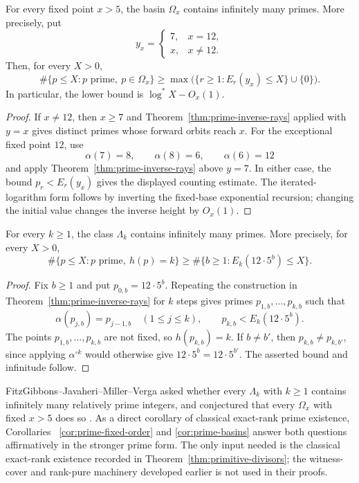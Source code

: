 \begin{corollary}
\label{cor:prime-basins}
For every fixed point $x>5$, the basin $\Omega_x$ contains infinitely many
primes.  More precisely, put
\[
 y_x=\begin{cases}7,&x=12,\\ x,&x\neq12.\end{cases}
\]
Then, for every $X>0$,
\[
 \#\{p\leq X:p\text{ prime},\ p\in\Omega_x\}
 \geq \max\bigl(\{r\geq1:E_r(y_x)\leq X\}\cup\{0\}\bigr).
\]
In particular, the lower bound is $\log^*X-O_x(1)$.
\end{corollary}

\begin{proof}
If $x\neq12$, then $x\geq7$ and Theorem~\ref{thm:prime-inverse-rays}
applied with $y=x$ gives distinct primes whose forward orbits reach $x$.
For the exceptional fixed point $12$, use
\[
 \alpha(7)=8,\qquad \alpha(8)=6,\qquad \alpha(6)=12
\]
and apply Theorem~\ref{thm:prime-inverse-rays} above $y=7$.  In either case,
the bound $p_r<E_r(y_x)$ gives the displayed counting estimate.  The
iterated-logarithm form follows by inverting the fixed-base exponential
recursion; changing the initial value changes the inverse height by
$O_x(1)$.
\end{proof}

\begin{corollary}
\label{cor:prime-fixed-order}
For every $k\geq1$, the class $\Lambda_k$ contains infinitely many primes.
More precisely, for every $X>0$,
\[
 \#\{p\leq X:p\text{ prime},\ h(p)=k\}
 \geq
 \#\{b\geq1:E_k(12\cdot5^b)\leq X\}.
\]
\end{corollary}

\begin{proof}
Fix $b\geq1$ and put $p_{0,b}=12\cdot5^b$.  Repeating the construction in
Theorem~\ref{thm:prime-inverse-rays} for $k$ steps gives primes
$p_{1,b},\ldots,p_{k,b}$ such that
\[
 \alpha(p_{j,b})=p_{j-1,b}\quad(1\leq j\leq k),
 \qquad p_{k,b}<E_k(12\cdot5^b).
\]
The points $p_{1,b},\ldots,p_{k,b}$ are not fixed, so
$h(p_{k,b})=k$.  If $b\neq b'$, then $p_{k,b}\neq p_{k,b'}$, since applying
$\alpha^{\circ k}$ would otherwise give
$12\cdot5^b=12\cdot5^{b'}$.  The asserted bound and infinitude follow.
\end{proof}

FitzGibbons--Javaheri--Miller--Verga asked whether every $\Lambda_k$ with
$k\geq1$ contains infinitely many relatively prime integers, and conjectured
that every $\Omega_x$ with fixed $x>5$ does so
\cite{FitzGibbonsJavaheriMillerVerga2025Dynamics}. As a direct corollary of
classical exact-rank prime existence, Corollaries~
\ref{cor:prime-fixed-order} and \ref{cor:prime-basins} answer both questions
affirmatively in the stronger prime form. The only input needed is the
classical exact-rank existence recorded in
Theorem~\ref{thm:primitive-divisors}; the witness-cover and rank-pure
machinery developed earlier is not used in their proofs.

